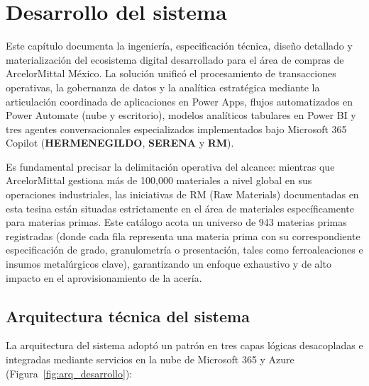 
\section{Desarrollo del sistema} \label{sec:desarrollo_sistema} %

Este capítulo documenta la ingeniería, especificación técnica, diseño detallado y materialización del ecosistema digital desarrollado para el área de compras de ArcelorMittal México. La solución unificó el procesamiento de transacciones operativas, la gobernanza de datos y la analítica estratégica mediante la articulación coordinada de aplicaciones en Power Apps, flujos automatizados en Power Automate (nube y escritorio), modelos analíticos tabulares en Power BI y tres agentes conversacionales especializados implementados bajo Microsoft 365 Copilot (\textbf{HERMENEGILDO}, \textbf{SERENA} y \textbf{RM}).

Es fundamental precisar la delimitación operativa del alcance: mientras que ArcelorMittal gestiona más de 100,000 materiales a nivel global en sus operaciones industriales, las iniciativas de RM (Raw Materials) documentadas en esta tesina están situadas estrictamente en el área de materiales específicamente para materias primas. Este catálogo acota un universo de 943 materias primas registradas (donde cada fila representa una materia prima con su correspondiente especificación de grado, granulometría o presentación, tales como ferroaleaciones e insumos metalúrgicos clave), garantizando un enfoque exhaustivo y de alto impacto en el aprovisionamiento de la acería.

\subsection{Arquitectura técnica del sistema}

La arquitectura del sistema adoptó un patrón en tres capas lógicas desacopladas e integradas mediante servicios en la nube de Microsoft 365 y Azure (Figura~\ref{fig:arq_desarrollo}):

